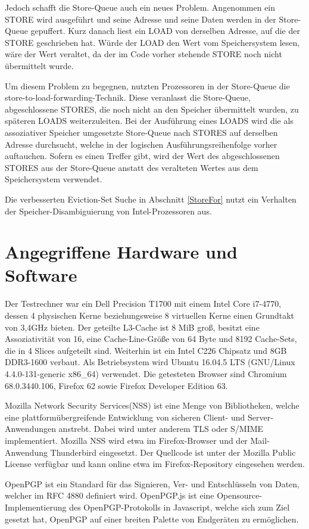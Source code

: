 Jedoch schafft die Store-Queue auch ein neues Problem.
Angenommen ein STORE wird ausgeführt und seine Adresse und seine Daten werden in der Store-Queue gepuffert. Kurz danach liest ein LOAD von derselben Adresse, auf die der STORE geschrieben hat.
Würde der LOAD den Wert vom Speichersystem lesen, wäre der Wert veraltet, da der im Code vorher stehende STORE noch nicht übermittelt wurde.

Um diesem Problem zu begegnen, nutzten Prozessoren in der Store-Queue die store-to-load-forwarding-Technik.
Diese veranlasst die Store-Queue, abgeschlossene STORES, die noch nicht an den Speicher übermittelt wurden, zu späteren LOADS weiterzuleiten.
Bei der Ausführung eines LOADS wird die als assoziativer Speicher umgesetzte Store-Queue nach STORES auf derselben Adresse durchsucht, welche in der logischen Ausführungsreihenfolge vorher auftauchen.
Sofern es einen Treffer gibt, wird der Wert des abgeschlossenen STORES aus der Store-Queue anstatt des veralteten Wertes aus dem Speichersystem verwendet.

Die verbesserten Eviction-Set Suche in Abschnitt \ref{StoreFor} nutzt ein Verhalten der Speicher-Disambiguierung von Intel-Prozessoren aus.

\section{Angegriffene Hardware und Software}

Der Testrechner war ein Dell Precision T1700 mit einem Intel Core i7-4770, dessen 4 physischen Kerne beziehungsweise 8 virtuellen Kerne einen Grundtakt von 3,4GHz bieten.
Der geteilte L3-Cache ist 8 MiB groß, besitzt eine Assoziativität von 16, eine Cache-Line-Größe von 64 Byte und 8192 Cache-Sets, die in 4 Slices aufgeteilt sind.
Weiterhin ist ein Intel C226 Chipsatz und 8GB DDR3-1600 verbaut. 
Als Betriebsystem wird Ubuntu 16.04.5 LTS (GNU/Linux 4.4.0-131-generic x86_64) verwendet. 
Die getesteten Browser sind Chromium 68.0.3440.106, Firefox 62 sowie Firefox Developer Edition 63.



Mozilla Network Security Services(NSS) \cite{MozillaNSS} ist eine Menge von Bibliotheken, welche eine plattformübergreifende Entwicklung von sicheren Client- und Server-Anwendungen anstrebt. Dabei wird unter anderem TLS oder S/MIME implementiert. Mozilla NSS wird etwa im Firefox-Browser und der Mail-Anwendung Thunderbird eingesetzt.
Der Quellcode ist unter der Mozilla Public License verfügbar und kann online etwa im Firefox-Repository \cite{MozillaDXR} eingesehen werden.

OpenPGP ist ein Standard für das Signieren, Ver- und Entschlüsseln von Daten, welcher im RFC 4880 \cite{rfc4880} definiert wird.
OpenPGP.js \cite{OpenPGPjs} ist eine Opensource-Implementierung des OpenPGP-Protokolls in Javascript, welche sich zum Ziel gesetzt hat, OpenPGP auf einer breiten Palette von Endgeräten zu ermöglichen.

